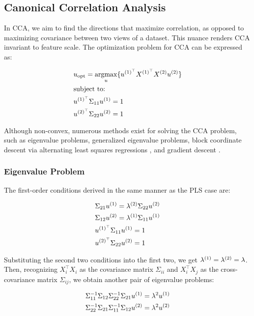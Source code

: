 \subsection{Canonical Correlation Analysis}\label{sec:cca}

In CCA, we aim to find the directions that maximize correlation, as opposed to maximizing covariance between two views of a dataset.
This nuance renders CCA invariant to feature scale. The optimization problem for CCA can be expressed as:

\begin{align}
     & u_{\text{opt}}=\underset{u}{\mathrm{argmax}}\{ u^{(1)^{\top}}X^{(1)^{\top}}X^{(2)}u^{(2)} \} \\
     & \text{subject to:} \notag \\
     & u^{(1)^{\top}}\Sigma_{11}u^{(1)}=1 \notag \\
     & u^{(2)^{\top}}\Sigma_{22}u^{(2)}=1 \notag
\end{align}

Although non-convex, numerous methods exist for solving the CCA problem, such as eigenvalue problems, generalized eigenvalue problems, block coordinate descent via alternating least squares regressions \citep{golub1995canonical,sun2008least} , and gradient descent \citep{via2007learning}.

\subsubsection{Eigenvalue Problem}

The first-order conditions derived in the same manner as the PLS case are:

\begin{align}\label{CCA:FOCs}
     & \Sigma_{21}u^{(1)}=\lambda^{(2)} \Sigma_{22}u^{(2)} \\
     & \Sigma_{12}u^{(2)}=\lambda^{(1)} \Sigma_{11}u^{(1)} \\
     & u^{(1)^{\top}}\Sigma_{11}u^{(1)}=1 \\
     & u^{(2)^{\top}}\Sigma_{22}u^{(2)}=1
\end{align}

Substituting the second two conditions into the first two, we get \(\lambda^{(1)}=\lambda^{(2)}=\lambda\). Then, recognizing \(X_i^{\top}X_i\) as the covariance matrix \(\Sigma_{ii}\) and \(X_i^{\top}X_j\) as the cross-covariance matrix \(\Sigma_{ij}\), we obtain another pair of eigenvalue problems:

\begin{align}
     & \Sigma_{11}^{-1}\Sigma_{12}\Sigma_{22}^{-1}\Sigma_{21}u^{(1)}=\lambda^2u^{(1)} \notag \\
     & \Sigma_{22}^{-1}\Sigma_{21}\Sigma_{11}^{-1}\Sigma_{12}u^{(2)}=\lambda^2u^{(2)} \notag
\end{align}

